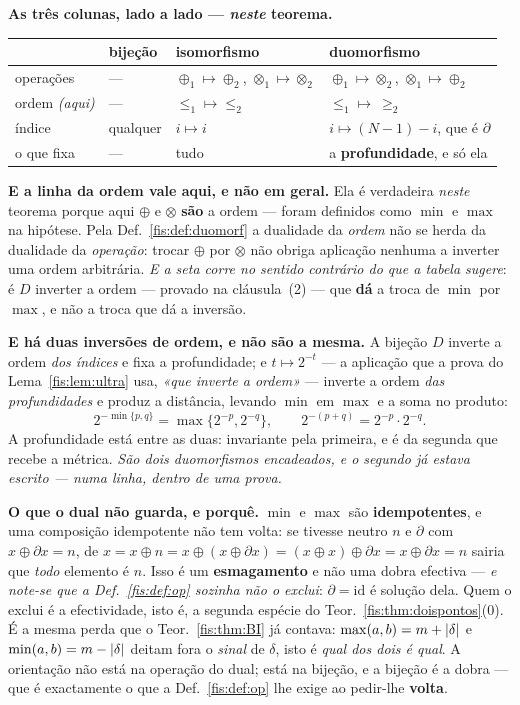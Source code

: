\documentclass[livro.tex]{subfiles}
\begin{document}
\medskip\noindent\textbf{As três colunas, lado a lado --- \emph{neste} teorema.}
\begin{center}\small
\begin{tabular}{@{}llll@{}}
\toprule
 & bijeção & isomorfismo & \textbf{duomorfismo} \\
\midrule
operações & --- & $\oplus_1\mapsto\oplus_2$, $\otimes_1\mapsto\otimes_2$ & $\oplus_1\mapsto\otimes_2$, $\otimes_1\mapsto\oplus_2$ \\
ordem \emph{(aqui)} & --- & $\le_1\mapsto\le_2$ & $\le_1\mapsto\ \ge_2$ \\
índice & qualquer & $i\mapsto i$ & $i\mapsto (N-1)-i$, que é $\partial$ \\
o que fixa & --- & tudo & a \textbf{profundidade}, e só ela \\
\bottomrule
\end{tabular}
\end{center}

\medskip\noindent\textbf{E a linha da ordem vale aqui, e não em geral.} Ela é
verdadeira \emph{neste} teorema porque aqui $\oplus$ e $\otimes$ \textbf{são} a
ordem --- foram definidos como $\min$ e $\max$ na hipótese. Pela
Def.~\ref{fis:def:duomorf} a dualidade da \emph{ordem} não se herda da dualidade
da \emph{operação}: trocar $\oplus$ por $\otimes$ não obriga aplicação nenhuma a
inverter uma ordem arbitrária. \emph{E a seta corre no sentido contrário do que a
tabela sugere}: é $D$ inverter a ordem --- provado na cláusula~(2) --- que
\textbf{dá} a troca de $\min$ por $\max$, e não a troca que dá a inversão.

\medskip\noindent\textbf{E há duas inversões de ordem, e não são a mesma.} A
bijeção $D$ inverte a ordem \emph{dos índices} e fixa a profundidade; e
$t\mapsto2^{-t}$ --- a aplicação que a prova do Lema~\ref{fis:lem:ultra} usa,
\emph{«que inverte a ordem»} --- inverte a ordem \emph{das profundidades} e
produz a distância, levando $\min$ em $\max$ e a soma no produto:
\[
2^{-\min\{p,q\}}=\max\{2^{-p},2^{-q}\},
\qquad
2^{-(p+q)}=2^{-p}\cdot2^{-q} .
\]
A profundidade está entre as duas: invariante pela primeira, e é da segunda que
recebe a métrica. \emph{São dois duomorfismos encadeados, e o segundo já estava
escrito --- numa linha, dentro de uma prova.}

\medskip\noindent\textbf{O que o dual não guarda, e porquê.} $\min$ e $\max$ são
\textbf{idempotentes}, e uma composição idempotente não tem volta: se tivesse
neutro $n$ e $\partial$ com $x\oplus\partial x=n$, de
$x=x\oplus n=x\oplus(x\oplus\partial x)=(x\oplus x)\oplus\partial x=x\oplus\partial x=n$
sairia que \emph{todo} elemento é $n$. Isso é um
\textbf{esmagamento} e não uma dobra efectiva --- \emph{e note-se que a
Def.~\ref{fis:def:op} sozinha não o exclui}: $\partial=\mathrm{id}$ é solução dela.
Quem o exclui é a efectividade, isto é, a segunda espécie do
Teor.~\ref{fis:thm:doispontos}(0). É a mesma perda que o
Teor.~\ref{fis:thm:BI} já contava: $\max(a,b)=m+\lvert \delta\rvert$ e
$\min(a,b)=m-\lvert \delta\rvert$ deitam fora o \emph{sinal} de $\delta$, isto é
\emph{qual dos dois é qual}. A orientação não está na operação do dual; está na
bijeção, e a bijeção é a dobra --- que é exactamente o que a
Def.~\ref{fis:def:op} lhe exige ao pedir-lhe \textbf{volta}.
\end{document}
